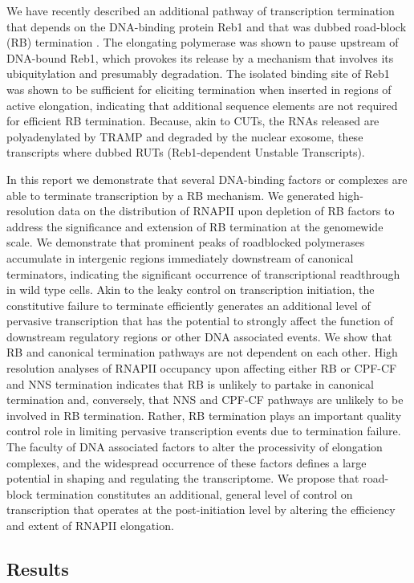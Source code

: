 We have recently described an additional pathway of transcription termination that depends on the DNA-binding protein Reb1 and that was dubbed road-block (RB) termination \cite{colin:2014:roadblock}. The elongating polymerase was shown to pause upstream of DNA-bound Reb1, which provokes its release by a mechanism that involves its ubiquitylation and presumably degradation. The isolated binding site of Reb1 was shown to be sufficient for eliciting termination when inserted in regions of active elongation, indicating that additional sequence elements are not required for efficient RB termination.  Because, akin to CUTs, the RNAs released are polyadenylated by TRAMP and degraded by the nuclear exosome, these transcripts where dubbed RUTs (Reb1-dependent Unstable Transcripts).  

In this report we demonstrate that several DNA-binding factors or complexes are able to terminate transcription by a RB mechanism. We generated high-resolution data on the distribution of RNAPII upon depletion of RB factors to address the significance and extension of RB termination at the genomewide scale.  We demonstrate that prominent peaks of roadblocked polymerases accumulate in intergenic regions immediately downstream of canonical terminators, indicating the significant occurrence of transcriptional readthrough in wild type cells. Akin to the leaky control on transcription initiation, the constitutive failure to terminate efficiently generates an additional level of pervasive transcription that has the potential to strongly affect the function of downstream regulatory regions or other DNA associated events. 
We show that RB and canonical termination pathways are not dependent on each other. High resolution analyses of RNAPII occupancy upon affecting either RB or CPF-CF and NNS termination indicates that RB is unlikely to partake in canonical termination and, conversely, that NNS and CPF-CF pathways are unlikely to be involved in RB termination. Rather, RB termination plays an important quality control role in limiting pervasive transcription events due to termination failure.  
The faculty of DNA associated factors to alter the processivity of elongation complexes, and the widespread occurrence of these factors defines a large potential in shaping and regulating the transcriptome. We propose that road-block termination constitutes an additional, general level of control on transcription that operates at the post-initiation level by altering the efficiency and extent of RNAPII elongation. 

\subsection{Results}

